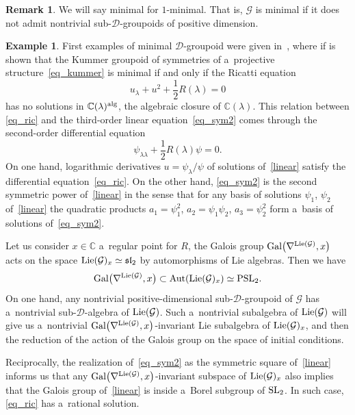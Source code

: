 \documentclass[pdftex]{sigma}
\numberwithin{equation}{section}
\theoremstyle{definition}
\newtheorem{Example}[Theorem]{Example}
\newtheorem{Remark}[Theorem]{Remark}
\begin{document}
\begin{Remark}
 We will say minimal for $1$-minimal. That is, $\mathcal G$ is minimal if it does not admit nontrivial sub-$\mathcal D$-groupoids of positive dimension.
\end{Remark}

\begin{Example} First examples of minimal $\mathcal D$-groupoid were given in~\cite[Proposition 3.6]{Casale_BlazquezSanz_ArenasTirado_2025}, where if is shown that the Kummer groupoid of symmetries of a~projective structure~\eqref{eq_kummer} is minimal if and only if the Ricatti equation
\begin{equation}\label{eq_ric}
u_\lambda + u^2 + \frac{1}{2}R(\lambda)=0
\end{equation}
has no solutions in $\mathbb C(\lambda)^{\rm alg}$, the algebraic closure of $\mathbb C(\lambda)$. This relation between \eqref{eq_ric} and the third-order linear equation~\eqref{eq_sym2} comes through the
second-order differential equation
\begin{equation}\label{linear}
\psi_{\lambda\lambda} + \frac{1}{2}R(\lambda)\psi = 0.
\end{equation}
On one hand, logarithmic derivatives $u = \psi_\lambda/\psi$ of solutions of~\eqref{linear} satisfy the differential equation~\eqref{eq_ric}. On the other hand, \eqref{eq_sym2} is the second symmetric power of~\eqref{linear} in the sense that for any basis of solutions $\psi_1$, $\psi_2$ of~\eqref{linear} the quadratic products
$
a_1 = \psi_1^2$, $ a_2 = \psi_1\psi_2$, $ a_3 = \psi_2^2$
form a~basis of solutions of~\eqref{eq_sym2}.

Let us consider $x\in \mathbb C$ a~regular point for $R$,
the Galois group ${\rm Gal}\bigl(\nabla^{{\rm Lie}(\mathcal G)}, x\bigr)$ acts on the space ${\rm Lie}(\mathcal G)_{x}\simeq \mathfrak{sl}_2$ by automorphisms of Lie algebras. Then we have
\[
{\rm Gal}\bigl(\nabla^{{\rm Lie}(\mathcal G)}, x\bigr) \subset \operatorname{Aut}({\rm Lie}(\mathcal G)_{x}) \simeq {\rm PSL}_2.\]
On one hand, any nontrivial positive-dimensional sub-$\mathcal D$-groupoid of $\mathcal G$ has a~nontrivial sub-$\mathcal D$-algebra of ${\rm Lie}(\mathcal G)$. Such a~nontrivial subalgebra of ${\rm Lie}(\mathcal G)$ will give us a~nontrivial ${\rm Gal}\bigl(\nabla^{{\rm Lie}(\mathcal G)}, x\bigr)$-invariant Lie subalgebra of ${\rm Lie}(\mathcal G)_{x}$, and then the reduction of the action of the Galois group on the space of initial conditions.

Reciprocally, the realization of~\eqref{eq_sym2} as the symmetric square of~\eqref{linear} informs us that any ${\rm Gal}\bigl(\nabla^{{\rm Lie}(\mathcal G)}, x\bigr)$-invariant subspace of ${\rm Lie}(\mathcal G)_x$ also implies that the Galois group of~\eqref{linear} is inside a~Borel subgroup of ${\rm SL}_2$. In such case, \eqref{eq_ric} has a~rational solution.


\end{Example}
\end{document}
